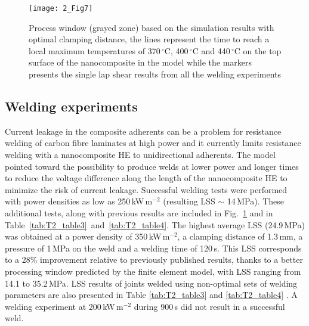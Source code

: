 \begin{figure}[ht]
	\centering
	\texttt{[image: 2\_Fig7]}
	\caption{Process window (grayed zone) based on the simulation results with optimal clamping distance, the lines represent the time to reach a local maximum temperatures of 370\,$^{\circ}$C, 400\,$^{\circ}$C and 440\,$^{\circ}$C on the top surface of the nanocomposite in the model while the markers presents the single lap shear results from all the welding experiments \cite{Brassard2019b}}
	\label{fig:2_Fig7}
\end{figure} 

\FloatBarrier
\subsection{Welding experiments}

Current leakage in the composite adherents can be a problem for resistance welding of carbon fibre laminates at high power and it currently limits resistance welding with a nanocomposite HE to unidirectional adherents. 
The model pointed toward the possibility to produce welds at lower power and longer times to reduce the voltage difference along the length of the nanocomposite HE to minimize the risk of current leakage. 
Successful welding tests were performed with power densities as low as \mbox{250\,kW\,m$^{-2}$} (resulting LSS $\sim$ \mbox{14\,MPa}). 
These additional tests, along with previous results are included in \mbox{Fig.~\ref{fig:2_Fig7}} and in \mbox{Table \ref{tab:T2_table3} and \ref{tab:T2_table4}}. 
The highest average LSS (\mbox{24.9\,MPa}) was obtained at a power density of \mbox{350\,kW\,m$^{-2}$}, a clamping distance of \mbox{1.3\,mm}, a pressure of \mbox{1\,MPa} on the weld and a welding time of \mbox{120\,s}. 
This LSS corresponds to a 28\% improvement relative to previously published results, thanks to a better processing window predicted by the finite element model, with LSS ranging from 14.1 to \mbox{35.2\,MPa}. 
LSS results of joints welded using non-optimal sets of welding parameters are also presented in Table \ref{tab:T2_table3} and \ref{tab:T2_table4} \cite{Brassard2019b}. 
A welding experiment at \mbox{200\,kW\,m$^{-2}$} during \mbox{900\,s} did not result in a successful weld.  


